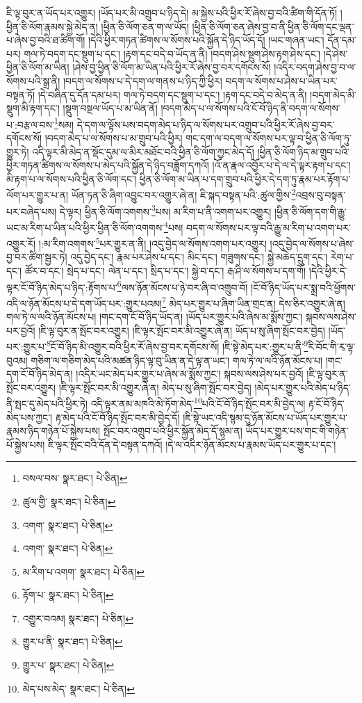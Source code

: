 ཇི་ལྟ་བུར་ན་ཡོད་པར་འགྱུར། །ཡོད་པར་མི་འགྲུབ་པ་ཉིད་དེ། མ་སྐྱེས་པའི་ཕྱིར་རོ་ཞེས་བྱ་བའི་ཚིག་གི་དོན་ཏོ། །ཕྱིན་ཅི་ལོག་རྣམས་སྐྱེ་མེད་ན། །ཕྱིན་ཅི་ལོག་ཅན་ག་ལ་ཡོད། །ཕྱིན་ཅི་ལོག་ཅན་ཞེས་བྱ་བ་ནི་ཕྱིན་ཅི་ལོག་དང་ལྡན་པ་ཞེས་བྱ་བའི་ཐ་ཚིག་གོ། །དེའི་ཕྱིར་གཏན་ཚིགས་ལ་སོགས་པའི་སྐྱོན་དེ་ཉིད་ཡོད་དོ། །ཡང་གཞན་ཡང་། དོན་དམ་པར། གལ་ཏེ་བདག་དང་སྡུག་པ་དང་། །རྟག་དང་བདེ་བ་ཡོད་ན་ནི། །བདག་ཤེས་སྡུག་ཤེས་རྟག་ཤེས་དང་། །དེ་ཤེས་ཕྱིན་ཅི་ལོག་མ་ཡིན། །ཤེས་བྱ་ཕྱིན་ཅི་ལོག་མ་ཡིན་པའི་ཕྱིར་རོ་ཞེས་བྱ་བར་དགོངས་སོ། །འདིར་བདག་ཤེས་བྱ་བ་ལ་སོགས་པའི་སྒྲ་ནི། །བདག་ལ་སོགས་པ་དེ་དག་ལ་གནས་པ་ཉིད་ཀྱི་ཕྱིར། བདག་ལ་སོགས་པ་ཤེས་པ་ཡིན་པར་བསྟན་ཏོ། །དེ་བཞིན་དུ་དོན་དམ་པར། གལ་ཏེ་བདག་དང་སྡུག་པ་དང་། །རྟག་དང་བདེ་བ་མེད་ན་ནི། །བདག་མེད་མི་སྡུག་མི་རྟག་དང་། །སྡུག་བསྔལ་ཡོད་པ་མ་ཡིན་ནོ། །བདག་མེད་པ་ལ་སོགས་པའི་ངོ་བོ་ཉིད་ནི་བདག་ལ་སོགས་པ་:བརྩལ་བས་\footnote{བསལ་བས་  སྣར་ཐང་།  པེ་ཅིན། }སམ། དེ་དག་ལ་ལྟོས་པས་བདག་མེད་པ་ཉིད་ལ་སོགས་པར་འགྲུབ་པའི་ཕྱིར་རོ་ཞེས་བྱ་བར་དགོངས་སོ། །བདག་མེད་པ་ལ་སོགས་པ་མ་གྲུབ་པའི་ཕྱིར། གང་དག་ལ་བདག་ལ་སོགས་པར་ལྟ་བ་ཕྱིན་ཅི་ལོག་ཏུ་གྱུར་ཏེ། འདི་ལྟར་མི་མེད་ན་སྡོང་དུམ་ལ་མིར་མཐོང་བའི་ཕྱིན་ཅི་ལོག་ཀྱང་མེད་དོ། །ཕྱིན་ཅི་ལོག་ཉིད་མ་གྲུབ་པའི་ཕྱིར་གཏན་ཚིགས་ལ་སོགས་པ་མེད་པའི་སྐྱོན་དེ་ཉིད་བཟློག་དཀའོ། །འོ་ན་རྣལ་འབྱོར་པ་དེ་ལ་དེ་ལྟར་རྟག་པ་དང་། མི་རྟག་པ་ལ་སོགས་པའི་ཕྱིན་ཅི་ལོག་དང་། ཕྱིན་ཅི་ལོག་མ་ཡིན་པ་དག་གྲུབ་པའི་ཕྱིར་དེ་དག་ཏུ་རྣམ་པར་རྟོག་པ་ལོག་པར་གྱུར་པ་ན། ཡོན་ཏན་ཅི་ཞིག་འབྱུང་བར་འགྱུར་ཞེ་ན། ཇི་སྐད་བསྟན་པའི་:ཚུལ་གྱིས་\footnote{ཚུལ་གྱི་  སྣར་ཐང་།  པེ་ཅིན། }འབྲས་བུ་བསྟན་པར་བཞེད་པས། དེ་ལྟར། ཕྱིན་ཅི་ལོག་འགགས་\footnote{འགག་  སྣར་ཐང་།  པེ་ཅིན། }པས། མ་རིག་པ་ནི་འགག་པར་འགྱུར། །ཕྱིན་ཅི་ལོག་དག་གི་རྒྱུ་ཡང་མ་རིག་པ་ཡིན་པའི་ཕྱིར་ཕྱིན་ཅི་ལོག་འགགས་\footnote{འགག་  སྣར་ཐང་།  པེ་ཅིན། }པས། བདག་ལ་སོགས་པར་ལྟ་བའི་རྒྱུ་མ་རིག་པ་འགག་པར་འགྱུར་རོ། །:མ་རིག་འགགས་\footnote{མ་རིག་པ་འགག་  སྣར་ཐང་།  པེ་ཅིན། }པར་གྱུར་ན་ནི། །འདུ་བྱེད་ལ་སོགས་འགག་པར་འགྱུར། །འདུ་བྱེད་ལ་སོགས་པ་ཞེས་བྱ་བར་ཚིག་སྦྱར་ཏེ། འདུ་བྱེད་དང་། རྣམ་པར་ཤེས་པ་དང་། མིང་དང་། གཟུགས་དང་། སྐྱེ་མཆེད་དྲུག་དང་། རེག་པ་དང་། ཚོར་བ་དང་། སྲེད་པ་དང་། ལེན་པ་དང་། སྲིད་པ་དང་། སྐྱེ་བ་དང་། རྒ་ཤི་ལ་སོགས་པ་དག་གོ། །དེའི་ཕྱིར་དེ་ལྟར་ངོ་བོ་ཉིད་མེད་པ་ཉིད་:རྟོགས་པ་\footnote{རྟོག་པ་  སྣར་ཐང་།  པེ་ཅིན། }ལས་ཉོན་མོངས་པ་ཉེ་བར་ཞི་བ་འགྲུབ་བོ། །ངོ་བོ་ཉིད་ཡོད་པར་སྨྲ་བའི་ཕྱོགས་འདི་ལ་ཉོན་མོངས་པ་དེ་དག་ཡོད་པར་:གྱུར་པའམ།\footnote{འགྱུར་བའམ།  སྣར་ཐང་།  པེ་ཅིན། } མེད་པར་གྱུར་པ་ཞིག་ཡིན་གྲང་ན། དེས་ཅིར་འགྱུར་ཞེ་ན། གལ་ཏེ་ལ་ལའི་ཉོན་མོངས་པ། །གང་དག་ངོ་བོ་ཉིད་ཡོད་ན། །ཡོད་པར་གྱུར་པའི་ཞེས་མ་སྨོས་ཀྱང་། སྐབས་ལས་ཤེས་པར་བྱའོ། །ཇི་ལྟ་བུར་ན་སྤོང་བར་འགྱུར། །ཇི་ལྟར་སྤོང་བར་མི་འགྱུར་ཞེ་ན། ཡོད་པ་སུ་ཞིག་སྤོང་བར་བྱེད། །ཡོད་པར་:གྱུར་པ་\footnote{གྱུར་པ་ནི་  སྣར་ཐང་།  པེ་ཅིན། }ངོ་བོ་ཉིད་མི་འགྱུར་བའི་ཕྱིར་རོ་ཞེས་བྱ་བར་དགོངས་སོ། །ཇི་སྟེ་མེད་པར་:གྱུར་པ་ནི་\footnote{གྱུར་པ་  སྣར་ཐང་།  པེ་ཅིན། }རི་བོང་གི་རྭ་ལྟ་བུའམ། གཅིག་ལ་གཅིག་མེད་པའི་མཚན་ཉིད་ལྟ་བུ་ཡིན་ན་དེ་ལྟ་ན་ཡང་། གལ་ཏེ་ལ་ལའི་ཉོན་མོངས་པ། །གང་དག་ངོ་བོ་ཉིད་མེད་ན། །འདིར་ཡང་མེད་པར་གྱུར་པ་ཞེས་མ་སྨོས་ཀྱང་། སྐབས་ལས་ཤེས་པར་བྱའོ། །ཇི་ལྟ་བུར་ན་སྤོང་བར་འགྱུར། །ཇི་ལྟར་སྤོང་བར་མི་འགྱུར་ཞེ་ན། མེད་པ་སུ་ཞིག་སྤོང་བར་བྱེད། །མེད་པར་གྱུར་པའི་མེད་པ་ཉིད་ནི་སྤང་དུ་མེད་པའི་ཕྱིར་ཏེ། འདི་ལྟར་ནམ་མཁའི་མེ་ཏོག་མེད་\footnote{མེད་པས་མེད་  སྣར་ཐང་།  པེ་ཅིན། }པའི་ངོ་བོ་ཉིད་སྤོང་བར་མི་བྱེད་ལ། རྟ་ངོ་བོ་ཉིད་མེད་པས་ཀྱང་། རྟ་མེད་པའི་ངོ་བོ་ཉིད་སྤོང་བར་མི་བྱེད་དོ། །ཇི་སྟེ་ཡང་འདི་སྙམ་དུ་ཉོན་མོངས་པ་ཡོད་པར་གྱུར་པ་རྣམས་ཉིད་གཉེན་པོ་སྐྱེས་པས། སྤོང་བར་འགྲུབ་པའི་ཕྱིར་སྐྱོན་མེད་དོ་སྙམ་ན། ཡོད་པར་གྱུར་པས་གང་གི་གཉེན་པོ་སྐྱེས་པས། ཇི་ལྟར་སྤོང་བའི་དོན་དེ་བསྟན་དཀའོ། །དེ་ལ་འདིར་ཉོན་མོངས་པ་རྣམས་ཡོད་པར་གྱུར་པ་དང་། 